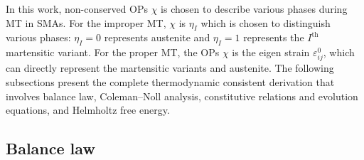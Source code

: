 \documentclass[reprint,3p,sort&compress,times,onecolumn]{elsarticle}
\begin{document}
In this work, non-conserved OPs $\chi$ is chosen to describe various phases during MT in SMAs. For the improper MT, $\chi$ is $\eta_I$ which is chosen to distinguish various phases: $\eta_I=0$ represents austenite and $\eta_I=1$ represents the $I^{\text{th}}$ martensitic variant. For the proper MT, the OPs $\chi$ is the eigen strain $\varepsilon_{ij}^0$, which can directly represent the martensitic variants and austenite.
The following subsections present the complete thermodynamic consistent derivation that involves balance law, Coleman--Noll analysis, constitutive relations and evolution equations, and Helmholtz free energy.



\subsection{Balance law}
\end{document}
